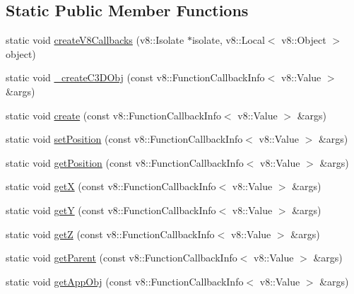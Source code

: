 \subsection*{Static Public Member Functions}
\begin{DoxyCompactItemize}
\item 
static void \mbox{\hyperlink{class_rad_j_a_v_1_1_c3_d_1_1_object3_d_a42b9106425180b519961f59cd00e526f}{create\+V8\+Callbacks}} (v8\+::\+Isolate $\ast$isolate, v8\+::\+Local$<$ v8\+::\+Object $>$ object)
\item 
static void \mbox{\hyperlink{class_rad_j_a_v_1_1_c3_d_1_1_object3_d_ad49751514d7d75a10ba14c621ec1f0a6}{\+\_\+create\+C3\+D\+Obj}} (const v8\+::\+Function\+Callback\+Info$<$ v8\+::\+Value $>$ \&args)
\item 
static void \mbox{\hyperlink{class_rad_j_a_v_1_1_c3_d_1_1_object3_d_ac3a54ccff742410e86e36c09b6e21f2a}{create}} (const v8\+::\+Function\+Callback\+Info$<$ v8\+::\+Value $>$ \&args)
\item 
static void \mbox{\hyperlink{class_rad_j_a_v_1_1_c3_d_1_1_object3_d_a9016baa3f33a49359ba7b3408e89b219}{set\+Position}} (const v8\+::\+Function\+Callback\+Info$<$ v8\+::\+Value $>$ \&args)
\item 
static void \mbox{\hyperlink{class_rad_j_a_v_1_1_c3_d_1_1_object3_d_aa4846c6adfaf1468999de8304ce825c6}{get\+Position}} (const v8\+::\+Function\+Callback\+Info$<$ v8\+::\+Value $>$ \&args)
\item 
static void \mbox{\hyperlink{class_rad_j_a_v_1_1_c3_d_1_1_object3_d_aedf5d835e7f4894d809587b318da1be2}{getX}} (const v8\+::\+Function\+Callback\+Info$<$ v8\+::\+Value $>$ \&args)
\item 
static void \mbox{\hyperlink{class_rad_j_a_v_1_1_c3_d_1_1_object3_d_aaa4dc547f1b440fd62e086b8a7aee323}{getY}} (const v8\+::\+Function\+Callback\+Info$<$ v8\+::\+Value $>$ \&args)
\item 
static void \mbox{\hyperlink{class_rad_j_a_v_1_1_c3_d_1_1_object3_d_a8ad9d6e53bf6c260a6e6e9393898865f}{getZ}} (const v8\+::\+Function\+Callback\+Info$<$ v8\+::\+Value $>$ \&args)
\item 
static void \mbox{\hyperlink{class_rad_j_a_v_1_1_c3_d_1_1_object3_d_a9a6d4b59baaa2e66978c7e8e4c0b9fc8}{get\+Parent}} (const v8\+::\+Function\+Callback\+Info$<$ v8\+::\+Value $>$ \&args)
\item 
static void \mbox{\hyperlink{class_rad_j_a_v_1_1_c3_d_1_1_object3_d_aba61f213905a7cecae41162a5b3fbe90}{get\+App\+Obj}} (const v8\+::\+Function\+Callback\+Info$<$ v8\+::\+Value $>$ \&args)

\end{DoxyCompactItemize}

